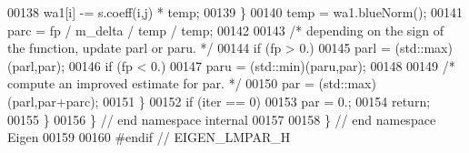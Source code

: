 \begin{DoxyCode}
00138           wa1[i] -= s.coeff(i,j) * temp;
00139       \}
00140       temp = wa1.blueNorm();
00141       parc = fp / m\_delta / temp / temp;
00142 
00143       \textcolor{comment}{/* depending on the sign of the function, update parl or paru. */}
00144       \textcolor{keywordflow}{if} (fp > 0.)
00145         parl = (std::max)(parl,par);
00146       \textcolor{keywordflow}{if} (fp < 0.)
00147         paru = (std::min)(paru,par);
00148 
00149       \textcolor{comment}{/* compute an improved estimate for par. */}
00150       par = (std::max)(parl,par+parc);
00151     \}
00152     \textcolor{keywordflow}{if} (iter == 0)
00153       par = 0.;
00154     \textcolor{keywordflow}{return};
00155   \}
00156 \} \textcolor{comment}{// end namespace internal}
00157 
00158 \} \textcolor{comment}{// end namespace Eigen}
00159 
00160 \textcolor{preprocessor}{#endif // EIGEN\_LMPAR\_H}
\end{DoxyCode}
